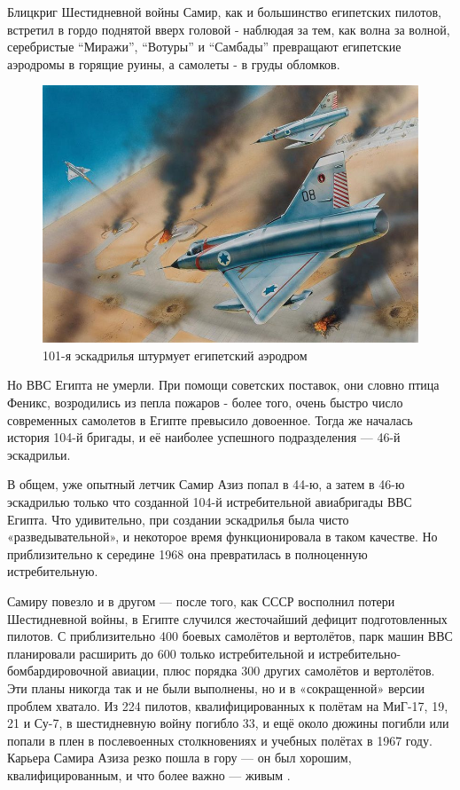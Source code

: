 Блицкриг Шестидневной войны Самир, как и большинство египетских пилотов, встретил в гордо поднятой вверх головой - наблюдая за тем, как волна за волной, серебристые “Миражи”, “Вотуры” и “Самбады” превращают египетские аэродромы в горящие руины, а самолеты - в груды обломков. 

\begin{figure}[h!tb] 
	\centering\includegraphics[scale=0.5]{History_Fenix/G0ZHOpHX9To.jpg}
	\caption{101-я эскадрилья штурмует египетский аэродром}%
\end{figure}

Но ВВС Египта не умерли. При помощи советских поставок, они словно птица Феникс, возродились из пепла пожаров - более того, очень быстро число современных самолетов в Египте превысило довоенное. Тогда же началась история 104-й бригады, и её наиболее успешного подразделения — 46-й эскадрильи.

В общем, уже опытный летчик Самир Азиз попал в 44-ю, а затем в 46-ю эскадрилью только что созданной 104-й истребительной авиабригады ВВС Египта. Что удивительно, при создании эскадрилья была чисто «разведывательной», и некоторое время функционировала в таком качестве. Но приблизительно к середине 1968 она превратилась в полноценную истребительную.

Самиру повезло и в другом — после того, как СССР восполнил потери Шестидневной войны, в Египте случился жесточайший дефицит подготовленных пилотов. С приблизительно 400 боевых самолётов и вертолётов, парк машин ВВС планировали расширить до 600 только истребительной и истребительно-бомбардировочной авиации, плюс порядка 300 других самолётов и вертолётов. Эти планы никогда так и не были выполнены, но и в «сокращенной» версии проблем хватало. Из 224 пилотов, квалифицированных к полётам на МиГ-17, 19, 21 и Су-7, в шестидневную войну погибло 33, и ещё около дюжины погибли или попали в плен в послевоенных столкновениях и учебных полётах в 1967 году. Карьера Самира Азиза резко пошла в гору — он был хорошим, квалифицированным, и что более важно — живым .

